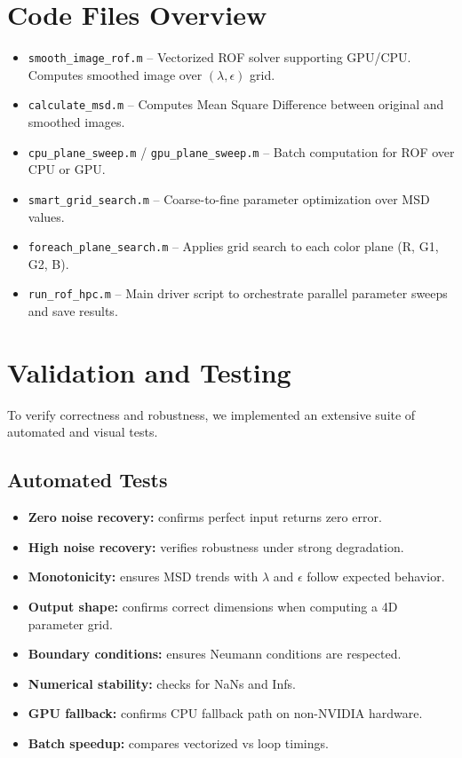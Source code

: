 \documentclass[11pt]{article}
\begin{document}
\section{Code Files Overview}
\begin{itemize}
  \item \texttt{smooth\_image\_rof.m} -- Vectorized ROF solver supporting GPU/CPU. Computes smoothed image over $(\lambda, \epsilon)$ grid.
  \item \texttt{calculate\_msd.m} -- Computes Mean Square Difference between original and smoothed images.
  \item \texttt{cpu\_plane\_sweep.m} / \texttt{gpu\_plane\_sweep.m} -- Batch computation for ROF over CPU or GPU.
  \item \texttt{smart\_grid\_search.m} -- Coarse-to-fine parameter optimization over MSD values.
  \item \texttt{foreach\_plane\_search.m} -- Applies grid search to each color plane (R, G1, G2, B).
  \item \texttt{run\_rof\_hpc.m} -- Main driver script to orchestrate parallel parameter sweeps and save results.
\end{itemize}


\section{Validation and Testing}
To verify correctness and robustness, we implemented an extensive suite of automated and visual tests.

\subsection{Automated Tests}
\begin{itemize}
  \item \textbf{Zero noise recovery:} confirms perfect input returns zero error.
  \item \textbf{High noise recovery:} verifies robustness under strong degradation.
  \item \textbf{Monotonicity:} ensures MSD trends with $\lambda$ and $\epsilon$ follow expected behavior.
  \item \textbf{Output shape:} confirms correct dimensions when computing a 4D parameter grid.
  \item \textbf{Boundary conditions:} ensures Neumann conditions are respected.
  \item \textbf{Numerical stability:} checks for NaNs and Infs.
  \item \textbf{GPU fallback:} confirms CPU fallback path on non-NVIDIA hardware.
  \item \textbf{Batch speedup:} compares vectorized vs loop timings.
\end{itemize}
\end{document}
